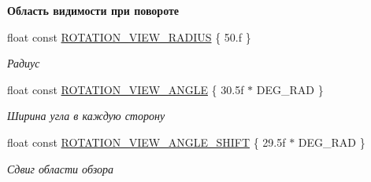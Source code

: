 \begin{Indent}\textbf{ Область видимости при повороте}\par
\begin{DoxyCompactItemize}
\item 
\mbox{\label{namespacertm_ae9ea4dbfd2f4bb3b5c6bf1c5ea7227d7}} 
float const \hyperlink{namespacertm_ae9ea4dbfd2f4bb3b5c6bf1c5ea7227d7}{R\+O\+T\+A\+T\+I\+O\+N\+\_\+\+V\+I\+E\+W\+\_\+\+R\+A\+D\+I\+US} \{ 50.f \}
\begin{DoxyCompactList}\small\item\em Радиус \end{DoxyCompactList}\item 
\mbox{\label{namespacertm_ab5d83fa039813239add636c5dfe1c64d}} 
float const \hyperlink{namespacertm_ab5d83fa039813239add636c5dfe1c64d}{R\+O\+T\+A\+T\+I\+O\+N\+\_\+\+V\+I\+E\+W\+\_\+\+A\+N\+G\+LE} \{ 30.\+5f $\ast$ D\+E\+G\+\_\+\+R\+A\+D \}
\begin{DoxyCompactList}\small\item\em Ширина угла в каждую сторону \end{DoxyCompactList}\item 
\mbox{\label{namespacertm_ab2e47618aa31260d6890c18525f611fa}} 
float const \hyperlink{namespacertm_ab2e47618aa31260d6890c18525f611fa}{R\+O\+T\+A\+T\+I\+O\+N\+\_\+\+V\+I\+E\+W\+\_\+\+A\+N\+G\+L\+E\+\_\+\+S\+H\+I\+FT} \{ 29.\+5f $\ast$ D\+E\+G\+\_\+\+R\+A\+D \}
\begin{DoxyCompactList}\small\item\em Сдвиг области обзора \end{DoxyCompactList}\end{DoxyCompactItemize}
\end{Indent}
